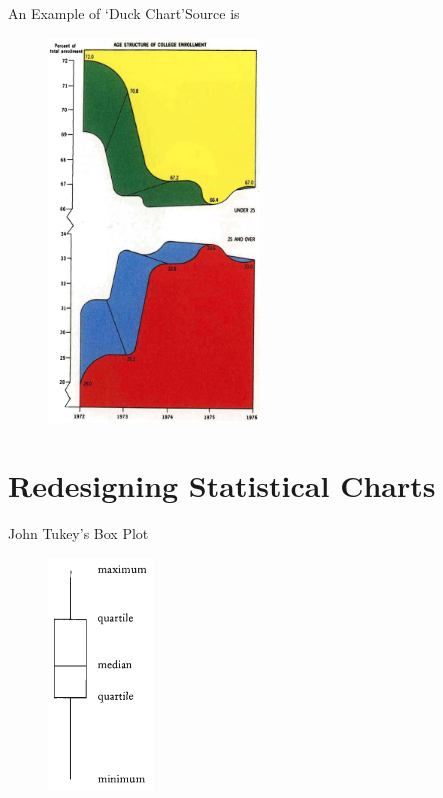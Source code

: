 \documentclass[notes, aspectratio=1610]{beamer}
\begin{document}
\begin{frame}{An Example of `Duck Chart'}{Source is \cite[][page 118]{tufte2001}}
	\begin{figure}
		\begin{center}
			\includegraphics[width=0.5\textwidth]{images/a_duck_chart.png}
		\end{center}
	\end{figure}
\end{frame}

\section{Redesigning Statistical Charts}

\begin{frame}{John Tukey's Box Plot}{}
	\begin{figure}
		\begin{center}
			\includegraphics[width=0.25\textwidth]{images/boxplot.png}
		\end{center}
	\end{figure}
\end{frame}
\end{document}
